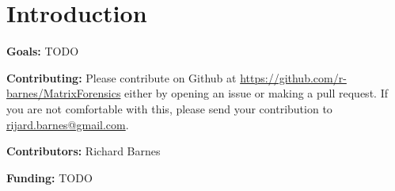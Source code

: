\chapter{Introduction}

\textbf{Goals:}
TODO



\textbf{Contributing:}
Please contribute on Github at \url{https://github.com/r-barnes/MatrixForensics} either by opening an issue or making a pull request. If you are not comfortable with this, please send your contribution to \url{rijard.barnes@gmail.com}.


\textbf{Contributors:}
Richard Barnes

\textbf{Funding:}
TODO